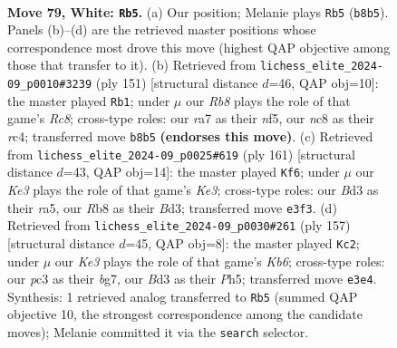 \documentclass[11pt]{article}
\begin{document}
\clearpage

\begin{figure}[p]\centering
\begin{subfigure}{0.46\textwidth}\centering
\resizebox{\linewidth}{!}{%
\newchessgame
\chessboard[
  setfen={1Rn5/r1k5/P1P5/7p/8/2pBK1PP/2P5/8 w - - 3 79},
  showmover=false,
  pgfstyle=straightmove, color=movearrow, markmove={b8-b5}
]}
\caption{}
\end{subfigure}\hfill
\begin{subfigure}{0.46\textwidth}\centering
\resizebox{\linewidth}{!}{%
\newchessgame
\chessboard[
  setfen={5b2/5k2/7p/1P2pNp1/2R1P1P1/3K4/8/2r5 b - - 0 76},
  showmover=false,
  pgfstyle=straightmove, color=movearrow, markmove={c1-b1}
]}
\caption{}
\end{subfigure}
\\[4pt]
\begin{subfigure}{0.46\textwidth}\centering
\resizebox{\linewidth}{!}{%
\newchessgame
\chessboard[
  setfen={8/7p/p3k2P/R7/PP2p3/2KbN3/r7/8 b - - 3 81},
  showmover=false,
  pgfstyle=straightmove, color=movearrow, markmove={e6-f6}
]}
\caption{}
\end{subfigure}\hfill
\begin{subfigure}{0.46\textwidth}\centering
\resizebox{\linewidth}{!}{%
\newchessgame
\chessboard[
  setfen={8/6B1/p5pK/P2R3p/2r2P1P/1k1b4/8/8 b - - 16 79},
  showmover=false,
  pgfstyle=straightmove, color=movearrow, markmove={b3-c2}
]}
\caption{}
\end{subfigure}
\caption{\textbf{Move 79, White: \texttt{Rb5}.} (a) Our position; Melanie plays \texttt{Rb5} (\texttt{b8b5}). Panels (b)--(d) are the retrieved master positions whose correspondence most drove this move (highest QAP objective among those that transfer to it). (b) Retrieved from \texttt{lichess\_elite\_2024-09\_p0010\#3239} (ply 151) [structural distance $d$=46, QAP obj=10]: the master played \texttt{Rb1}; under $\mu$ our \emph{Rb8} plays the role of that game's \emph{Rc8}; cross-type roles: our \emph{r}a7 as their \emph{n}f5, our \emph{n}c8 as their \emph{r}c4; transferred move \texttt{b8b5} \textbf{(endorses this move)}. (c) Retrieved from \texttt{lichess\_elite\_2024-09\_p0025\#619} (ply 161) [structural distance $d$=43, QAP obj=14]: the master played \texttt{Kf6}; under $\mu$ our \emph{Ke3} plays the role of that game's \emph{Ke3}; cross-type roles: our \emph{B}d3 as their \emph{r}a5, our \emph{R}b8 as their \emph{B}d3; transferred move \texttt{e3f3}. (d) Retrieved from \texttt{lichess\_elite\_2024-09\_p0030\#261} (ply 157) [structural distance $d$=45, QAP obj=8]: the master played \texttt{Kc2}; under $\mu$ our \emph{Ke3} plays the role of that game's \emph{Kb6}; cross-type roles: our \emph{p}c3 as their \emph{b}g7, our \emph{B}d3 as their \emph{P}h5; transferred move \texttt{e3e4}. Synthesis: 1 retrieved analog transferred to \texttt{Rb5} (summed QAP objective 10, the strongest correspondence among the candidate moves); Melanie committed it via the \texttt{search} selector.}
\label{fig:thought-m156}
\end{figure}
\end{document}
